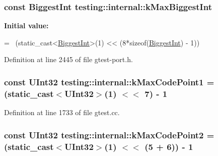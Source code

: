 \subsubsection[{\texorpdfstring{k\+Max\+Biggest\+Int}{kMaxBiggestInt}}]{\setlength{\rightskip}{0pt plus 5cm}const {\bf Biggest\+Int} testing\+::internal\+::k\+Max\+Biggest\+Int}\hypertarget{namespacetesting_1_1internal_ad901880198832bc166d2493096b451f7}{}\label{namespacetesting_1_1internal_ad901880198832bc166d2493096b451f7}
{\bfseries Initial value\+:}
\begin{DoxyCode}
=
    ~(\textcolor{keyword}{static\_cast<}\hyperlink{namespacetesting_1_1internal_a05c6bd9ede5ccdf25191a590d610dcc6}{BiggestInt}\textcolor{keyword}{>}(1) << (8*\textcolor{keyword}{sizeof}(\hyperlink{namespacetesting_1_1internal_a05c6bd9ede5ccdf25191a590d610dcc6}{BiggestInt}) - 1))
\end{DoxyCode}


Definition at line 2445 of file gtest-\/port.\+h.

\subsubsection[{\texorpdfstring{k\+Max\+Code\+Point1}{kMaxCodePoint1}}]{\setlength{\rightskip}{0pt plus 5cm}const {\bf U\+Int32} testing\+::internal\+::k\+Max\+Code\+Point1 = (static\+\_\+cast$<${\bf U\+Int32}$>$(1) $<$$<$ 7) -\/ 1}\hypertarget{namespacetesting_1_1internal_a128515c8ed6c0fe98e498c8042da2060}{}\label{namespacetesting_1_1internal_a128515c8ed6c0fe98e498c8042da2060}


Definition at line 1733 of file gtest.\+cc.

\subsubsection[{\texorpdfstring{k\+Max\+Code\+Point2}{kMaxCodePoint2}}]{\setlength{\rightskip}{0pt plus 5cm}const {\bf U\+Int32} testing\+::internal\+::k\+Max\+Code\+Point2 = (static\+\_\+cast$<${\bf U\+Int32}$>$(1) $<$$<$ (5 + 6)) -\/ 1}\hypertarget{namespacetesting_1_1internal_ab8f4a5ed784352f00342cfeadc72337e}{}\label{namespacetesting_1_1internal_ab8f4a5ed784352f00342cfeadc72337e}


